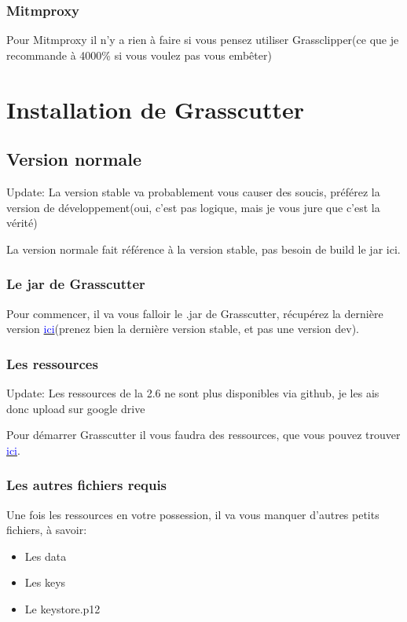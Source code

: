 \documentclass{article}
\begin{document}
\subsubsection{Mitmproxy}
Pour Mitmproxy il n'y a rien à faire si vous pensez utiliser Grassclipper(ce que je recommande à 4000\% si vous voulez pas vous embêter)

\hrulefill

\section{Installation de Grasscutter}

\subsection{Version normale}
Update: La version stable va probablement vous causer des soucis, préférez la version de développement(oui, c'est pas logique, mais je vous jure que c'est la vérité)\newline

La version normale fait référence à la version stable, pas besoin de build le jar ici.

\subsubsection{Le jar de Grasscutter}
Pour commencer, il va vous falloir le .jar de Grasscutter, récupérez la dernière version \href{https://github.com/Grasscutters/Grasscutter/releases}{\textcolor{blue}{ici}}(prenez bien la dernière version stable, et pas une version dev).

\subsubsection{Les ressources}
Update: Les ressources de la 2.6 ne sont plus disponibles via github, je les ais donc upload sur google drive\newline

Pour démarrer Grasscutter il vous faudra des ressources, que vous pouvez trouver \href{https://drive.google.com/file/d/1ilN0Hb3VK2AVIef7sjR0Bk3Ll_tt7Yiu/view?usp=sharing}{\textcolor{blue}{ici}}.

\subsubsection{Les autres fichiers requis}
Une fois les ressources en votre possession, il va vous manquer d'autres petits fichiers, à savoir:
\begin{itemize}
	\item Les data
	\item Les keys
	\item Le keystore.p12
\end{itemize}
\end{document}
